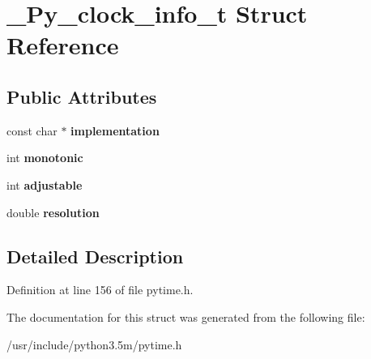 \hypertarget{struct__Py__clock__info__t}{}\section{\+\_\+\+Py\+\_\+clock\+\_\+info\+\_\+t Struct Reference}
\label{struct__Py__clock__info__t}
\subsection*{Public Attributes}
\begin{DoxyCompactItemize}
\item 
const char $\ast$ {\bfseries implementation}\hypertarget{struct__Py__clock__info__t_abdd45261c08f1c2006260a53cbdf2e23}{}\label{struct__Py__clock__info__t_abdd45261c08f1c2006260a53cbdf2e23}

\item 
int {\bfseries monotonic}\hypertarget{struct__Py__clock__info__t_ae5413085c06ff516322f26df5bd066c8}{}\label{struct__Py__clock__info__t_ae5413085c06ff516322f26df5bd066c8}

\item 
int {\bfseries adjustable}\hypertarget{struct__Py__clock__info__t_a0c6afaf3db00a025cd1c448e1db70307}{}\label{struct__Py__clock__info__t_a0c6afaf3db00a025cd1c448e1db70307}

\item 
double {\bfseries resolution}\hypertarget{struct__Py__clock__info__t_ac4d55c6c34572877030b45103daad2c2}{}\label{struct__Py__clock__info__t_ac4d55c6c34572877030b45103daad2c2}

\end{DoxyCompactItemize}


\subsection{Detailed Description}


Definition at line 156 of file pytime.\+h.



The documentation for this struct was generated from the following file\+:\begin{DoxyCompactItemize}
\item 
/usr/include/python3.\+5m/pytime.\+h\end{DoxyCompactItemize}
